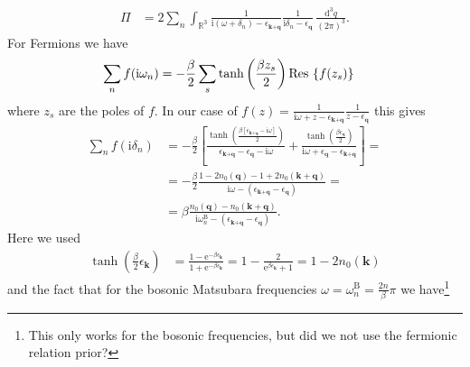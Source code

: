 \documentclass[english, parskip=full]{scrartcl}
\newcommand{\intr}{}
\newcommand{\kla}{}
\newcommand{\klam}{}
\newcommand{\klammer}{}
\newcommand{\tecxt}{}
\renewcommand{\i}{\text{i}}
\newcommand{\e}{\text{e}}
\begin{document}
\begin{align}
\Pi &= 2 \sum_n \int_{\mathbb{R}^{3}} \frac{1}{\i(\omega + \delta_n) - \epsilon_{\textbf{k} + \textbf{q}}} \frac{1}{\i\delta_n - \epsilon_{\textbf{q}} } \, \frac{\mathrm{d}^{3}q}{(2\pi)^3}.
\end{align}
For Fermions we have
\begin{align}
\sum_n f(\i\omega_n) &= -\frac{\beta}{2} \sum_s \tanh\kla\left( \frac{\beta z_s}{2} \right) \tecxt\text{Res\,}\klammer\left\{ f(z_s) \right\}
\end{align}
where $z_s$ are the poles of $f$.
In our case of $f(z) = \frac{1}{\i\omega + z - \epsilon_{\textbf{k} + \textbf{q}}} \frac{1}{z - \epsilon_\textbf{q}}$ this gives
\begin{align}
\sum_n f(\i\delta_n) &= -\frac{\beta}{2} \klam\left[ \frac{\tanh\kla\left( \frac{\beta [\epsilon_{\textbf{k} + \textbf{q}} - \i\omega]}{2} \right)}{\epsilon_{\textbf{k} + \textbf{q}} - \epsilon_\textbf{q} - \i\omega} + \frac{\tanh\kla\left( \frac{\beta \epsilon_\textbf{q}}{2} \right)}{\i\omega + \epsilon_\textbf{q} - \epsilon_{\textbf{k} + \textbf{q}}} \right] = \\
&= -\frac{\beta}{2} \frac{1-2n_0(\textbf{q}) - 1 + 2n_0(\textbf{k} + \textbf{q})}{\i\omega - (\epsilon_{\textbf{k} + \textbf{q}} - \epsilon_\textbf{q})} = \\
&= \beta \frac{n_0(\textbf{q}) - n_0(\textbf{k} + \textbf{q})}{\i\omega_n^\tecxt\text{B} - (\epsilon_{\textbf{k} + \textbf{q}} - \epsilon_\textbf{q})}.
\end{align}
Here we used
\begin{align}
\tanh(\frac{\beta}{2} \epsilon_\textbf{k}) &= \frac{1 - \e^{-\beta\epsilon_\textbf{k}}}{1 + \e^{-\beta\epsilon_\textbf{k}}} = 1 - \frac{2}{\e^{\beta\epsilon_\textbf{k}} + 1} = 1 - 2n_0(\textbf{k})
\end{align}
and the fact that for the bosonic Matsubara frequencies $\omega = \omega_n^\tecxt\text{B} = \frac{2n}{\beta}\pi$ we have\footnote{This only works for the bosonic frequencies, but did we not use the fermionic relation prior?}
\end{document}
